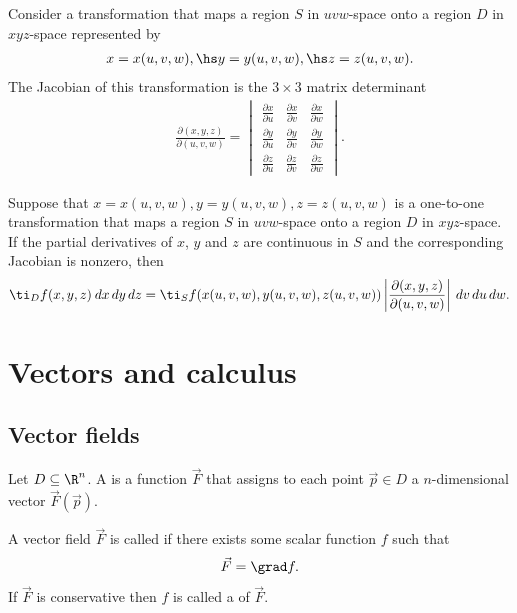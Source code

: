 \documentclass{article}
\begin{document}
\begin{definition}
    Consider a transformation that maps a region $S$ in $uvw$-space onto a region $D$ in
    $xyz$-space represented by
    \begin{align*}
        x=x(u,v,w),\hs y=y(u,v,w),\hs z=z(u,v,w).
    \end{align*}
    The Jacobian of this transformation is the $3\times3$ matrix determinant
    \begin{align*}
        \frac{\partial(x,y,z)}{\partial(u,v,w)}=\begin{vmatrix}
            \frac{\partial x}{\partial u}&\frac{\partial x}{\partial v}&\frac{\partial x}{\partial w}\\
            \frac{\partial y}{\partial u}&\frac{\partial y}{\partial v}&\frac{\partial y}{\partial w}\\
            \frac{\partial z}{\partial u}&\frac{\partial z}{\partial v}&\frac{\partial z}{\partial w}
        \end{vmatrix}.
    \end{align*}
\end{definition}
\begin{theorem}
    Suppose that $x=x(u,v,w),y=y(u,v,w),z=z(u,v,w)$ is a one-to-one transformation that maps a
    region $S$ in $uvw$-space onto a region $D$ in $xyz$-space. If the partial derivatives of
    $x$, $y$ and $z$ are continuous in $S$ and the corresponding Jacobian is nonzero,
    then
    \begin{align*}
       \ti_D f(x,y,z)\:dx\,dy\,dz = \ti_S f(x(u,v,w), y(u,v,w), z(u,v,w))\left|\frac{\partial(x,y,z)}{\partial(u,v,w)}\right|\:dv\,du\,dw. 
    \end{align*}
\end{theorem}



\section{Vectors and calculus}



\subsection{Vector fields}

\begin{definition}
    Let $D\subseteq \R^n$. A  is a function $\vec F$ that assigns
    to each point $\vec p\in D$ a $n$-dimensional vector $\vec F(\vec p)$.
\end{definition}
\begin{definition}
    A vector field $\vec F$ is called  if there exists some scalar function
    $f$ such that
    \begin{align*}
        \vec F = \grad f.
    \end{align*}
    If $\vec F$ is conservative then $f$ is called a  of $\vec F$.
\end{definition}
\end{document}
